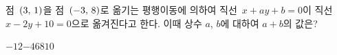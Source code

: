 점~$(3,\mkern3mu 1)$을 점~$(-3,\mkern3mu 8)$로 옮기는 평행이동에 의하여 직선~$x+ay+b=0$이 직선~$x-2y+10=0$으로 옮겨진다고 한다. 이때 상수 $a$, $b$에 대하여 $a+b$의 값은?
\begin{choices32}{$-12$}{$-4$}{$6$}{$8$}{$10$}\end{choices32}
